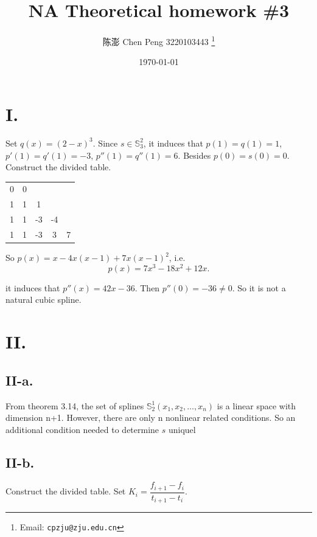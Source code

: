 \documentclass[a4paper]{article}
\begin{document}
\title{NA Theoretical homework \#3}

\author{陈澎 Chen Peng 3220103443
  \thanks{Email: \texttt{cpzju@zju.edu.cn}}}


\date{\today}

\maketitle

\section*{I.}
Set $q(x)=(2-x)^3$. Since $s\in \mathbb{S}_3^2$, it induces that $p(1)=q(1)=1$, $p'(1)=q'(1)=-3$, $p''(1)=q''(1)=6$. Besides $p(0)=s(0)=0$.
Construct the divided table.

\begin{table}[!htbp]
  \centering
  \begin{tabular}{c|cccc}
    0 & 0 & & & \\
    1 & 1 & 1 & &  \\
    1 & 1 &-3 & -4 & \\
    1 & 1 &-3 & 3 & 7 \\
  \end{tabular}
\end{table}

So $p(x)=x-4x(x-1)+7x(x-1)^2$, i.e.
$$p(x)=7x^3-18x^2+12x.$$

it induces that $p''(x)=42x-36$. Then $p''(0)=-36\neq0$. So it is not a natural cubic spline.

\section*{II.}
\subsection*{II-a.}
From theorem 3.14, the set of splines $\mathbb{S}_2^1(x_1,x_2,\ldots,x_n)$ is a linear space with dimension n+1. 
However, there are only n nonlinear related conditions. So an additional condition needed to determine $s$ uniquel

\subsection*{II-b.}
Construct the divided table. Set $K_i=\dfrac{f_{i+1}-f_i}{t_{i+1}-t_i}$.
\end{document}
